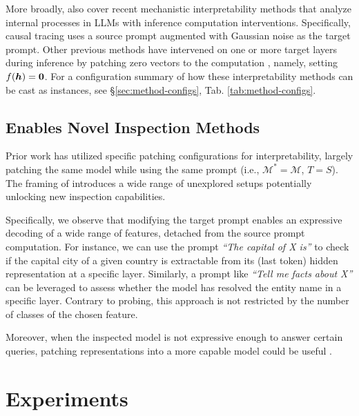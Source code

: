 \documentclass{article}
\theoremstyle{plain}
\theoremstyle{definition}
\theoremstyle{remark}
\begin{document}
More broadly, \methodFamilyName{} also cover recent mechanistic interpretability methods that analyze internal processes in LLMs with 
inference computation
interventions. Specifically, causal tracing \cite{meng2022locating} uses a source prompt augmented with Gaussian noise as the target prompt. Other previous methods have intervened on one or more target layers during inference by patching zero vectors to the computation \cite{wang2022interpretability, conmy2023automated, geva-etal-2023-dissecting}, namely, setting $f({\bm{h}}) = \mathbf{0}$. For a configuration summary of how these interpretability methods can be cast as \methodName{} instances, see \S\ref{sec:method-configs}, Tab. \ref{tab:method-configs}.

\subsection{\methodFamilyName{} Enables Novel Inspection Methods}
\label{sec:novel-methods}

Prior work has utilized specific patching configurations for interpretability, largely patching the same model while using the same prompt (i.e., $\mathcal{M}^* = \mathcal{M}$, $T=S$).
The framing of \methodFamilyName{} introduces a wide range of unexplored setups potentially unlocking new inspection capabilities.

Specifically, we observe that modifying the target prompt enables an expressive decoding of a wide range of features, detached from the source prompt computation. For instance, we can use the prompt \textit{``The capital of X is''} to check if the capital city of a given country is extractable from its (last token) hidden representation at a specific layer.
Similarly, a prompt like \textit{``Tell me facts about X''} can be leveraged to assess whether the model has resolved the entity name in a specific layer.
Contrary to probing, this approach is not restricted by the number of classes of the chosen feature.

Moreover, when the inspected model is not expressive enough to answer certain queries, patching representations into a more capable model could be useful  \citep{hernandez2022natural,singh2023explaining,schwettmann2023multimodal}.


\section{Experiments}
\label{sec:experiments}
\end{document}
